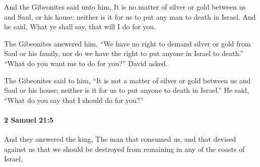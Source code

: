 			\begin{versebox}
					\item[BHS] 
					\item[ASV] And the Gibeonites said unto him, It is no matter of silver or gold between us and Saul, or his house; neither is it for us to put any man to death in Israel. And he said, What ye shall say, that will I do for you.
					\item[NIV] The Gibeonites answered him, “We have no right to demand silver or gold from Saul or his family, nor do we have the right to put anyone in Israel to death.” “What do you want me to do for you?” David asked.
					\item[NRSV] The Gibeonites said to him, “It is not a matter of silver or gold between us and Saul or his house; neither is it for us to put anyone to death in Israel.” He said, “What do you say that I should do for you?”
			\end{versebox}

		\paragraph{2 Samuel 21:5} %
			\label{2SAMUEL-21-5}

			And they answered the king, The man that consumed us, and that devised against us that we should be destroyed from remaining in any of the coasts of Israel,

